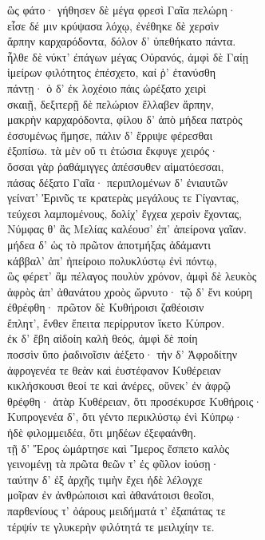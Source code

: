 \quad{}ὣς φάτο· γήθησεν δὲ μέγα φρεσὶ Γαῖα πελώρη· \\
εἷσε δέ μιν κρύψασα λόχῳ, ἐνέθηκε δὲ χερσὶν \\
ἅρπην καρχαρόδοντα, δόλον δ' ὑπεθήκατο πάντα.  \\
ἦλθε δὲ νύκτ' ἐπάγων μέγας Οὐρανός, ἀμφὶ δὲ Γαίῃ\\
ἱμείρων φιλότητος ἐπέσχετο, καί ῥ' ἐτανύσθη\\
πάντῃ· ὁ δ' ἐκ λοχέοιο πάις ὠρέξατο χειρὶ\\
σκαιῇ, δεξιτερῇ δὲ πελώριον ἔλλαβεν ἅρπην,\\
μακρὴν καρχαρόδοντα, φίλου δ' ἀπὸ μήδεα πατρὸς \\
ἐσσυμένως ἤμησε, πάλιν δ' ἔρριψε φέρεσθαι\\
ἐξοπίσω. τὰ μὲν οὔ τι ἐτώσια ἔκφυγε χειρός· \\
ὅσσαι γὰρ ῥαθάμιγγες ἀπέσσυθεν αἱματόεσσαι,\\
πάσας δέξατο Γαῖα· περιπλομένων δ' ἐνιαυτῶν \\
γείνατ' Ἐρινῦς τε κρατερὰς μεγάλους τε Γίγαντας, \\
τεύχεσι λαμπομένους, δολίχ' ἔγχεα χερσὶν ἔχοντας,\\
Νύμφας θ' ἃς Μελίας καλέουσ' ἐπ' ἀπείρονα γαῖαν. \\
μήδεα δ' ὡς τὸ πρῶτον ἀποτμήξας ἀδάμαντι\\
κάββαλ' ἀπ' ἠπείροιο πολυκλύστῳ ἐνὶ πόντῳ,\\
ὣς φέρετ' ἂμ πέλαγος πουλὺν χρόνον, ἀμφὶ δὲ λευκὸς \\
ἀφρὸς ἀπ' ἀθανάτου χροὸς ὤρνυτο· τῷ δ' ἔνι κούρη \\
ἐθρέφθη· πρῶτον δὲ Κυθήροισι ζαθέοισιν \\
ἔπλητ', ἔνθεν ἔπειτα περίρρυτον ἵκετο Κύπρον.\\
ἐκ δ' ἔβη αἰδοίη καλὴ θεός, ἀμφὶ δὲ ποίη\\
ποσσὶν ὕπο ῥαδινοῖσιν ἀέξετο· τὴν δ' Ἀφροδίτην  \\
ἀφρογενέα τε θεὰν καὶ ἐυστέφανον Κυθέρειαν\\
κικλήσκουσι θεοί τε καὶ ἀνέρες, οὕνεκ' ἐν ἀφρῷ\\
θρέφθη· ἀτὰρ Κυθέρειαν, ὅτι προσέκυρσε Κυθήροις· \\
Κυπρογενέα δ', ὅτι γέντο περικλύστῳ ἐνὶ Κύπρῳ·\\
ἠδὲ φιλομμειδέα, ὅτι μηδέων ἐξεφαάνθη. \\
τῇ δ' Ἔρος ὡμάρτησε καὶ Ἵμερος ἔσπετο καλὸς\\
γεινομένῃ τὰ πρῶτα θεῶν τ' ἐς φῦλον ἰούσῃ· \\
ταύτην δ' ἐξ ἀρχῆς τιμὴν ἔχει ἠδὲ λέλογχε\\
μοῖραν ἐν ἀνθρώποισι καὶ ἀθανάτοισι θεοῖσι,\\
παρθενίους τ' ὀάρους μειδήματά τ' ἐξαπάτας τε \\
τέρψίν τε γλυκερὴν φιλότητά τε μειλιχίην τε.

